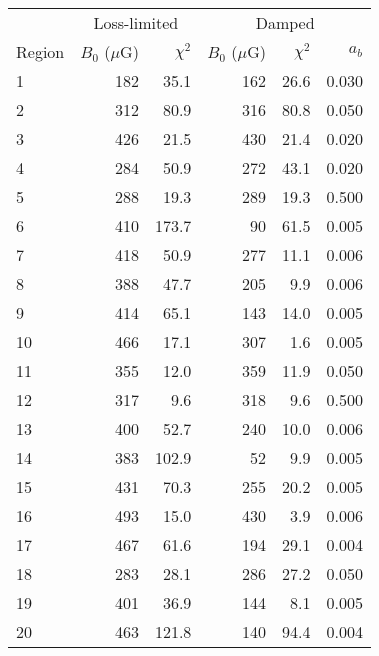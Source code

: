\begin{tabular}{@{} l rr rrr @{}}
\toprule
{} & \multicolumn{2}{c}{Loss-limited}
   & \multicolumn{3}{c}{Damped} \\
\cmidrule(lr){2-3} \cmidrule(l){4-6}
Region & $B_0$ ($\mu$G) & $\chi^2$
       & $B_0$ ($\mu$G) & $\chi^2$ & $a_b$ \\
\midrule
 1 & 182 &  35.1 & 162 & 26.6 & 0.030 \\
 2 & 312 &  80.9 & 316 & 80.8 & 0.050 \\
 3 & 426 &  21.5 & 430 & 21.4 & 0.020 \\
\cmidrule{1-6}
 4 & 284 &  50.9 & 272 & 43.1 & 0.020 \\
 5 & 288 &  19.3 & 289 & 19.3 & 0.500 \\
 6 & 410 & 173.7 &  90 & 61.5 & 0.005 \\
 7 & 418 &  50.9 & 277 & 11.1 & 0.006 \\
 8 & 388 &  47.7 & 205 &  9.9 & 0.006 \\
 9 & 414 &  65.1 & 143 & 14.0 & 0.005 \\
10 & 466 &  17.1 & 307 &  1.6 & 0.005 \\
\cmidrule{1-6}
11 & 355 &  12.0 & 359 & 11.9 & 0.050 \\
12 & 317 &   9.6 & 318 &  9.6 & 0.500 \\
13 & 400 &  52.7 & 240 & 10.0 & 0.006 \\
\cmidrule{1-6}
14 & 383 & 102.9 &  52 &  9.9 & 0.005 \\
15 & 431 &  70.3 & 255 & 20.2 & 0.005 \\
16 & 493 &  15.0 & 430 &  3.9 & 0.006 \\
17 & 467 &  61.6 & 194 & 29.1 & 0.004 \\
\cmidrule{1-6}
18 & 283 &  28.1 & 286 & 27.2 & 0.050 \\
19 & 401 &  36.9 & 144 &  8.1 & 0.005 \\
20 & 463 & 121.8 & 140 & 94.4 & 0.004 \\
\bottomrule
\end{tabular}
